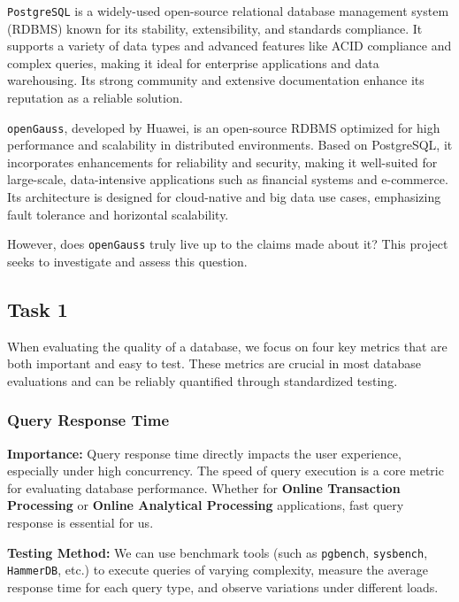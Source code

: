 \documentclass[12pt,a4paper,cs4size]{ctexart}
\begin{document}
\texttt{PostgreSQL} is a widely-used open-source relational database management system (RDBMS) known for its stability, extensibility, and standards compliance. It supports a variety of data types and advanced features like ACID compliance and complex queries, making it ideal for enterprise applications and data warehousing. Its strong community and extensive documentation enhance its reputation as a reliable solution.

\texttt{openGauss}, developed by Huawei, is an open-source RDBMS optimized for high performance and scalability in distributed environments. Based on PostgreSQL, it incorporates enhancements for reliability and security, making it well-suited for large-scale, data-intensive applications such as financial systems and e-commerce. Its architecture is designed for cloud-native and big data use cases, emphasizing fault tolerance and horizontal scalability.


However, does \texttt{openGauss} truly live up to the claims made about it? This project seeks to investigate and assess this question.


\newpage

\subsection*{Task 1}

When evaluating the quality of a database, we focus on four key metrics that are both important and easy to test. These metrics are crucial in most database evaluations and can be reliably quantified through standardized testing.

\subsubsection*{Query Response Time}

\textbf{Importance:} Query response time directly impacts the user experience, especially under high concurrency. The speed of query execution is a core metric for evaluating database performance. Whether for \textbf{Online Transaction Processing} or \textbf{Online Analytical Processing} applications, fast query response is essential for us.

\textbf{Testing Method:} We can use benchmark tools (such as \texttt{pgbench}, \texttt{sysbench}, \texttt{HammerDB}, etc.) to execute queries of varying complexity, measure the average response time for each query type, and observe variations under different loads.
\end{document}
